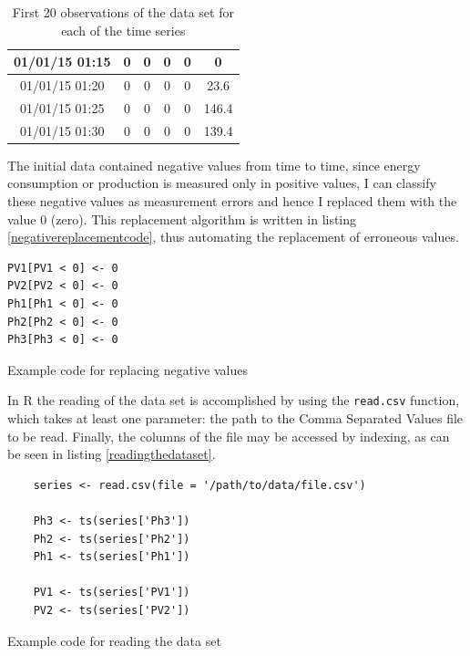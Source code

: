 \documentclass[12pt,a4paper,titlepage]{report}
\begin{document}
\begin{table}[h]
\begin{tabular}{|c|c|c|c|c|c|}
        01/01/15 01:15 & 0   & 0   & 0    & 0                                                  & 0     \\ \hline
        01/01/15 01:20 & 0   & 0   & 0    & 0                                                  & 23.6  \\ \hline
        01/01/15 01:25 & 0   & 0   & 0    & 0                                                  & 146.4 \\ \hline
        01/01/15 01:30 & 0   & 0   & 0    & 0                                                  & 139.4 \\ \hline
    \end{tabular}
\centering
\caption{First 20 observations of the data set for each of the time series}
\label{exampledata}
\end{table}

The initial data contained negative values from time to time, since energy consumption or production is measured only in positive values, I can classify these negative values as measurement errors and hence I replaced them with the value $ 0 $ (zero). This replacement algorithm is written in listing \ref{negativereplacementcode}, thus automating the replacement of erroneous values.

\begin{listing}[h]
    \begin{verbatim}
PV1[PV1 < 0] <- 0
PV2[PV2 < 0] <- 0
Ph1[Ph1 < 0] <- 0
Ph2[Ph2 < 0] <- 0
Ph3[Ph3 < 0] <- 0
\end{verbatim}

\caption{Example code for replacing negative values}
\label{negativereplacementcode}
\end{listing}

In R the reading of the data set is accomplished by using the \texttt{read.csv} function, which takes at least one parameter: the path to the Comma Separated Values file to be read. Finally, the columns of the file may be accessed by indexing, as can be seen in listing \ref{readingthedataset}.

\begin{listing}[h]
    \begin{verbatim}
    series <- read.csv(file = '/path/to/data/file.csv')
    
    Ph3 <- ts(series['Ph3'])
    Ph2 <- ts(series['Ph2'])
    Ph1 <- ts(series['Ph1'])
    
    PV1 <- ts(series['PV1'])
    PV2 <- ts(series['PV2'])
    \end{verbatim}
    
    \caption{Example code for reading the data set}
    \label{readingthedataset}
\end{listing}
\end{document}
